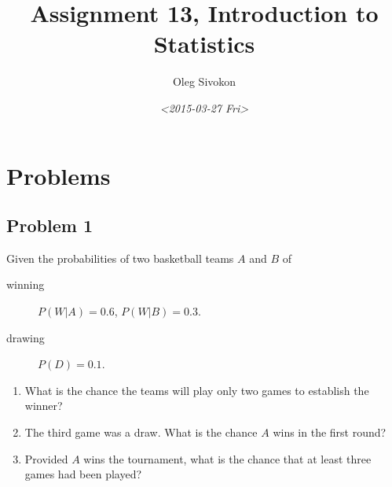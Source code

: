 \documentclass[11pt]{article}
\author{Oleg Sivokon}
\date{\textit{<2015-03-27 Fri>}}
\title{Assignment 13, Introduction to Statistics}
\begin{document}
\maketitle
\tableofcontents



\clearpage

\section{Problems}
\label{sec-1}

\subsection{Problem 1}
\label{sec-1-1}
Given the probabilities of two basketball teams $A$ and $B$ of
\begin{description}
\item[{winning}] $P(W | A) = 0.6$, $P(W | B) = 0.3$.
\item[{drawing}] $P(D) = 0.1$.
\end{description}


\begin{enumerate}
\item What is the chance the teams will play only two games to establish
the winner?
\item The third game was a draw.  What is the chance $A$ wins in the
first round?
\item Provided $A$ wins the tournament, what is the chance that at least three
games had been played?
\end{enumerate}
\end{document}
